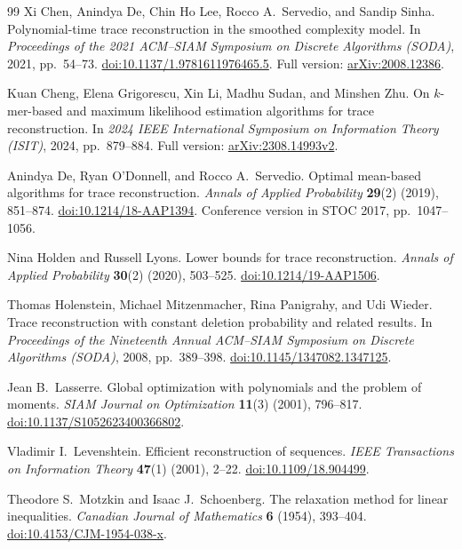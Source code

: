 \begin{thebibliography}{99}
Xi Chen, Anindya De, Chin Ho Lee, Rocco A.~Servedio, and Sandip Sinha.
Polynomial-time trace reconstruction in the smoothed complexity model.
In \emph{Proceedings of the 2021 ACM--SIAM Symposium on Discrete
Algorithms (SODA)}, 2021, pp.~54--73.
\href{https://doi.org/10.1137/1.9781611976465.5}{doi:10.1137/1.9781611976465.5}.
Full version: \href{https://arxiv.org/abs/2008.12386}{arXiv:2008.12386}.

Kuan Cheng, Elena Grigorescu, Xin Li, Madhu Sudan, and Minshen Zhu.
On $k$-mer-based and maximum likelihood estimation algorithms for trace
reconstruction.
In \emph{2024 IEEE International Symposium on Information Theory
(ISIT)}, 2024, pp.~879--884.
Full version: \href{https://arxiv.org/abs/2308.14993v2}{arXiv:2308.14993v2}.

Anindya De, Ryan O'Donnell, and Rocco A.~Servedio.
Optimal mean-based algorithms for trace reconstruction.
\emph{Annals of Applied Probability} \textbf{29}(2) (2019), 851--874.
\href{https://doi.org/10.1214/18-AAP1394}{doi:10.1214/18-AAP1394}.
Conference version in STOC 2017, pp.~1047--1056.

Nina Holden and Russell Lyons.
Lower bounds for trace reconstruction.
\emph{Annals of Applied Probability} \textbf{30}(2) (2020), 503--525.
\href{https://doi.org/10.1214/19-AAP1506}{doi:10.1214/19-AAP1506}.

Thomas Holenstein, Michael Mitzenmacher, Rina Panigrahy, and Udi Wieder.
Trace reconstruction with constant deletion probability and related
results.
In \emph{Proceedings of the Nineteenth Annual ACM--SIAM Symposium on
Discrete Algorithms (SODA)}, 2008, pp.~389--398.
\href{https://doi.org/10.1145/1347082.1347125}{doi:10.1145/1347082.1347125}.

Jean B.~Lasserre.
Global optimization with polynomials and the problem of moments.
\emph{SIAM Journal on Optimization} \textbf{11}(3) (2001), 796--817.
\href{https://doi.org/10.1137/S1052623400366802}{doi:10.1137/S1052623400366802}.

Vladimir I.~Levenshtein.
Efficient reconstruction of sequences.
\emph{IEEE Transactions on Information Theory} \textbf{47}(1) (2001),
2--22.
\href{https://doi.org/10.1109/18.904499}{doi:10.1109/18.904499}.

Theodore S.~Motzkin and Isaac J.~Schoenberg.
The relaxation method for linear inequalities.
\emph{Canadian Journal of Mathematics} \textbf{6} (1954), 393--404.
\href{https://doi.org/10.4153/CJM-1954-038-x}{doi:10.4153/CJM-1954-038-x}.


\end{thebibliography}
